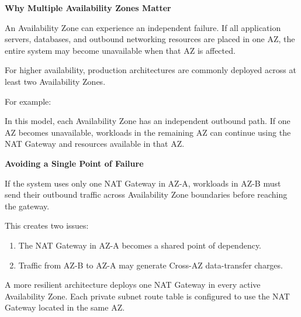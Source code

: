\vspace{0.5em}\noindent\textbf{Why Multiple Availability Zones
Matter}\par

An Availability Zone can experience an independent failure. If all
application servers, databases, and outbound networking resources are
placed in one AZ, the entire system may become unavailable when that AZ
is affected.

For higher availability, production architectures are commonly deployed
across at least two Availability Zones.

For example:

\begin{Shaded}
\begin{Highlighting}[]

\end{Highlighting}
\end{Shaded}

In this model, each Availability Zone has an independent outbound path.
If one AZ becomes unavailable, workloads in the remaining AZ can
continue using the NAT Gateway and resources available in that AZ.

\vspace{0.5em}\noindent\textbf{Avoiding a Single Point of
Failure}\par

If the system uses only one NAT Gateway in AZ-A, workloads in AZ-B must
send their outbound traffic across Availability Zone boundaries before
reaching the gateway.

This creates two issues:

\begin{enumerate}
\def\labelenumi{\arabic{enumi}.}
\tightlist
\item
  The NAT Gateway in AZ-A becomes a shared point of dependency.
\item
  Traffic from AZ-B to AZ-A may generate Cross-AZ data-transfer charges.
\end{enumerate}

A more resilient architecture deploys one NAT Gateway in every active
Availability Zone. Each private subnet route table is configured to use
the NAT Gateway located in the same AZ.

